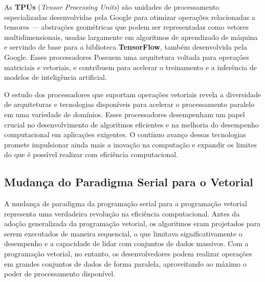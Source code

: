 \documentclass[12pt,
openright, 
oneside, %
a4paper,    %
brazil]{facom-ufu-abntex2}
\begin{document}
As \textbf{TPUs} (\textit{Tensor Processing Units}) são unidades de processamento especializadas desenvolvidas pela Google para otimizar operações relacionadas a tensores --- abstrações geométricas que podem ser representadas como vetores multidimensionais, usadas largamente em algoritmos de aprendizado de máquina e servindo de base para a biblioteca \textbf{TensorFlow}, também desenvolvida pela Google. Esses processadores Possuem uma arquitetura voltada para operações matriciais e vetoriais, e contribuem para acelerar o treinamento e a inferência de modelos de inteligência artificial.

O estudo dos processadores que suportam operações vetoriais revela a diversidade de arquiteturas e tecnologias disponíveis para acelerar o processamento paralelo em uma variedade de domínios. Esses processadores desempenham um papel crucial no desenvolvimento de algoritmos eficientes e na melhoria do desempenho computacional em aplicações exigentes. O contínuo avanço dessas tecnologias promete impulsionar ainda mais a inovação na computação e expandir os limites do que é possível realizar com eficiência computacional.




\subsection{Mudança do Paradigma Serial para o Vetorial}

A mudança de paradigma da programação serial para a programação vetorial representa uma verdadeira revolução na eficiência computacional. Antes da adoção generalizada da programação vetorial, os algoritmos eram projetados para serem executados de maneira sequencial, o que limitava significativamente o desempenho e a capacidade de lidar com conjuntos de dados massivos. Com a programação vetorial, no entanto, os desenvolvedores podem realizar operações em grandes conjuntos de dados de forma paralela, aproveitando ao máximo o poder de processamento disponível.


\end{document}
